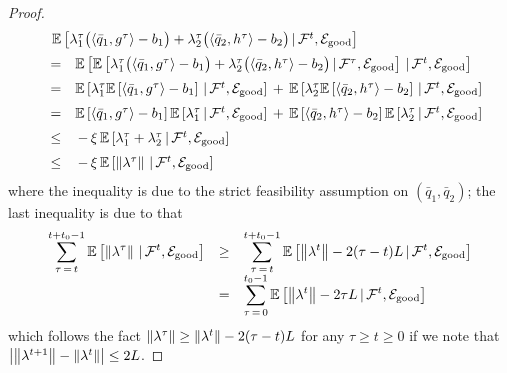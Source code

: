 \documentclass[12pt, final]{l4dc2023}
\begin{document}
\begin{proof}
	\[
	\begin{array}{rcl}
	&& \!\!\!\! \!\!\!\! \!\!\mathbb{E} \sbr{ \lambda_1^{\tau} \big(\langle{ \bar q_1},{g^{\tau}}\rangle 
		-b_1\big) + \lambda_2^{\tau} \big( \langle{ \bar q_2},{h^{\tau}}\rangle -b_2\big) \,\vert\, \calF^{t}, \mathcal{E}_{\text{good}}}
	\\[0.2cm]
	&=&
	\mathbb{E} \sbr{ \mathbb{E} \sbr{ \lambda_1^{\tau} \big(\langle{ \bar q_1},{g^{\tau}}\rangle 
			-b_1\big) + \lambda_2^{\tau} \big(
			\langle{ \bar q_2},{h^{\tau}}\rangle -b_2\big) \,\vert\, \calF^{\tau}, \mathcal{E}_{\text{good}}} \,\vert\, \calF^{t}, \mathcal{E}_{\text{good}}}
	\\[0.2cm]
	&=&
	\mathbb{E} \sbr{ \lambda_1^{\tau}  \mathbb{E} \sbr{ \langle{ \bar q_1},{g^{\tau}}\rangle 
			-b_1} \,\vert\, \calF^{t}, \mathcal{E}_{\text{good}}}
	\,+\,
	\mathbb{E} \sbr{ \lambda_2^{\tau}  \mathbb{E} \sbr{
			\langle{ \bar q_2},{h^{\tau}}\rangle -b_2} \,\vert\, \calF^{t}, \mathcal{E}_{\text{good}}}
	\\[0.2cm]
	&=&
	\mathbb{E} \sbr{ \langle{ \bar q_1},{g^{\tau}}\rangle - b_1} 
	\mathbb{E} \sbr{ \lambda_1^{\tau}  \,\vert\, \calF^{t}, \mathcal{E}_{\text{good}}}
	\,+\,
	\mathbb{E} \sbr{  \langle{ \bar q_2},{h^{\tau}}\rangle -b_2} 
	\mathbb{E} \sbr{ \lambda_2^{\tau}  \,\vert\, \calF^{t}, \mathcal{E}_{\text{good}}}
	\\[0.2cm]
	&\leq & \,-\, \xi \,	\mathbb{E}\sbr{ \lambda_1^{\tau} + \lambda_2^{\tau} \,\vert\, \calF^{t}, \mathcal{E}_{\text{good}}}
	\\[0.2cm]
	&\leq & \,-\, \xi \,	\mathbb{E}\sbr{ \norm{\lambda^{\tau} } \,\vert\, \calF^{t}, \mathcal{E}_{\text{good}}}
	\end{array}
	\]
	where the inequality is due to the strict feasibility assumption on $(\bar q_1,\bar q_2)$; the last inequality is due to that 
	\[
	\begin{array}{rcl}
	\displaystyle 
	\sum_{\tau\,=\,t}^{t+t_0-1} 
	\mathbb{E}\left[ \left\|{\lambda^{\tau}}\right\|  \,\vert\, {\mathcal{F}}^{t}, \mathcal{E}_{\text{good}}\right] 
	& \geq &
	\displaystyle
	\sum_{\tau\,=\,t}^{t+t_0-1} 
	\mathbb{E}\left[  \left\|{\lambda^t}\right\| - 2(\tau-t)L \,\vert\, {\mathcal{F}}^{t}, \mathcal{E}_{\text{good}}\right] 
	\\[0.2cm]
	& = &
	\displaystyle
	\sum_{\tau\,=\,0}^{t_0-1} 
	\mathbb{E}\left[ \left\|{ \lambda^t}\right\| - 2\tau L \,\vert\, {\mathcal{F}}^{t}, \mathcal{E}_{\text{good}}\right] 
	\end{array}
	\]
	which follows the fact $ \left\|{\lambda^\tau}\right\| \geq \left\|{\lambda^t}\right\| - 2(\tau-t)L$ for any $\tau\geq t\geq 0$ if we note that $ \left| \left\|{\lambda^{t+1}}\right\|  - \left\|{\lambda^{t}}\right\| \right| \leq 2L$.

\end{proof}
\end{document}
